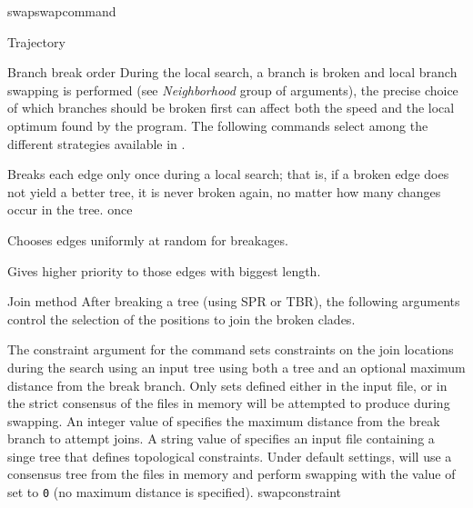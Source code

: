 \begin{command}{swap}{swapcommand}
\begin{arguments}
\begin{argumentgroup}{Trajectory}
	\end{argumentgroup}

	\begin{argumentgroup}{Branch break order}
		{During the local search, a branch is broken and local branch swapping
		is performed (see \emph{Neighborhood} group of arguments), the
		precise choice of which branches
        should be broken first can affect both the speed and the local
        optimum found by the program. The following commands select among
        the different strategies available in \poy.}
        
            {Breaks each edge only once during a local search; that is, if a
            broken edge does not yield a better tree, it is never broken again,
            no matter how many changes occur in the tree.}
            {once}

            {Chooses edges uniformly at random for breakages.}
            {}

            {Gives higher priority to those edges with biggest length.}
            {}

    \end{argumentgroup}

    \begin{argumentgroup}{Join method}
        {After breaking a tree (using SPR or TBR), the following 
        arguments control the selection of the positions to join the broken
        clades.}

                {The constraint argument for the  command sets
                constraints on the join locations during the search using an
                input tree using both a tree and an optional maximum distance
                from the break branch. Only sets defined either in the input
                file, or in the strict consensus of the files in memory will be
                attempted to produce during swapping. An integer value of
                 specifies the maximum distance from the
                break branch to attempt joins. A string value of
                 specifies an input file containing a singe
                tree that defines topological constraints. Under default settings,
                will use a consensus tree from the files in memory and perform
                swapping with the value of  set to \texttt{0}
                (no maximum distance is specified).}
                {swapconstraint}


\end{argumentgroup}
\end{arguments}
\end{command}
